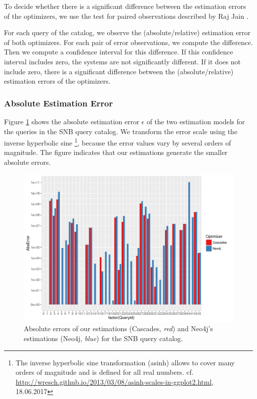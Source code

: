 To decide whether there is a significant difference between the estimation
errors of the optimizers, we use the test for paired observations described by
Raj Jain \cite[p.~209]{jain_art_1991}.

For each query of the catalog, we observe the (absolute/relative) estimation
error of both optimizers. For each pair of error observations, we compute the
difference. Then we compute a confidence interval for this difference.
If this confidence interval includes zero, the systems are not significantly
different. If it does not include zero, there is a significant difference
between the (absolute/relative) estimation errors of the optimizers.

%
%
\subsubsection{Absolute Estimation Error}

Figure \ref{fig:abs-error-snb} shows the absolute estimation error $\epsilon$
of the two estimation models for the queries in the SNB query catalog.
We transform the error scale using the inverse hyperbolic sine%
\footnote{The inverse hyperbolic sine transformation (asinh) allows to cover
many orders of magnitude and is defined for all real numbers.
cf. \url{http://wresch.github.io/2013/03/08/asinh-scales-in-ggplot2.html},
18.06.2017},
because the error values vary by several orders of magnitude.
The figure indicates that our estimations generate the smaller absolute errors.

\begin{figure}
  \centering
  \includegraphics[width=\textwidth]{figures/eval/abs_error_snb.pdf}
  \caption{Absolute errors of our estimations (Cascades, \emph{red})
           and Neo4j's estimations (Neo4j, \emph{blue})
           for the SNB query catalog.}
  \label{fig:abs-error-snb}
\end{figure}

